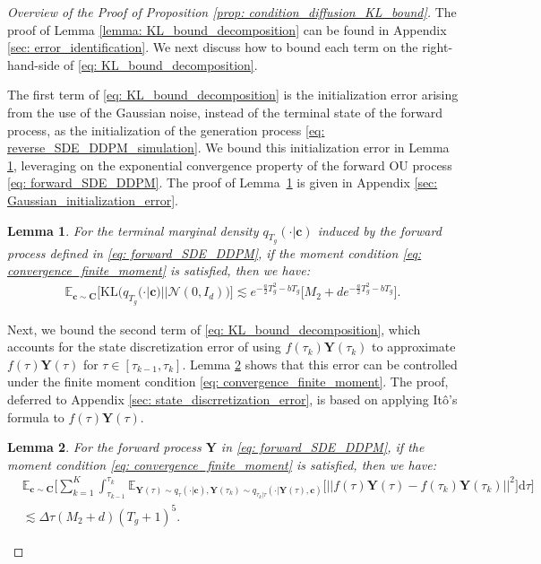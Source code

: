 \documentclass[11pt]{article}
\newtheorem{lemma}{Lemma}
\newcommand{\mE}{\mathbb{E}}
\newcommand{\bY}{\mathbf{Y}}
\newcommand{\bc}{\mathbf{c}}
\newcommand{\bC}{\mathbf{C}}
\newcommand{\KL}{\text{KL}}
\newcommand{\intd}{\mathrm{d}}
\begin{document}
\begin{proof}[Overview of the Proof of Proposition \ref{prop: condition_diffusion_KL_bound}]
The proof of Lemma \ref{lemma: KL_bound_decomposition} can be found in Appendix \ref{sec: error_identification}. We next discuss how to bound each term on the right-hand-side of \eqref{eq: KL_bound_decomposition}.



The first term of \eqref{eq: KL_bound_decomposition} is the initialization error arising from the use of the Gaussian noise, instead of the terminal state of the forward process, as the initialization of the generation process \eqref{eq: reverse_SDE_DDPM_simulation}. We bound this initialization error in Lemma \ref{lemma: initial_dist_error_bound}, leveraging on the exponential convergence property of the forward OU process \eqref{eq: forward_SDE_DDPM}. The proof of Lemma~\ref{lemma: initial_dist_error_bound} is given in Appendix \ref{sec: Gaussian_initialization_error}.


\begin{lemma}\label{lemma: initial_dist_error_bound}
For the terminal marginal density $q_{T_g}(\cdot | \bc)$ induced by the forward process defined in \eqref{eq: forward_SDE_DDPM}, if the moment condition \eqref{eq: convergence_finite_moment} is satisfied, then we have:
    \begin{align*}
        \mE_{\bc\sim\bC}\bigg[\KL\big(q_{T_g}(\cdot | \bc) || \mathcal{N}(0, I_d)\big)\bigg]\lesssim e^{-\frac{a}{2}T_g^2 - bT_g}\big[M_2 + de^{-\frac{a}{2}T_g^2 - bT_g}\big].
    \end{align*}
\end{lemma}

Next, we bound the second term of \eqref{eq: KL_bound_decomposition}, which accounts for the state discretization error of using $f(\tau_k)\bY(\tau_k)$ to approximate $f(\tau)\bY(\tau)$ for $\tau\in[\tau_{k - 1}, \tau_k]$. Lemma \ref{lemma: state_discrete_error_bound} shows that this error can be controlled under the finite moment condition \eqref{eq: convergence_finite_moment}. The proof, deferred to Appendix \ref{sec: state_discrretization_error}, is based on applying It\^{o}'s formula to $f(\tau)\bY(\tau)$.



\begin{lemma}\label{lemma: state_discrete_error_bound}
    For the forward process $\bY$ in \eqref{eq: forward_SDE_DDPM}, if the moment condition \eqref{eq: convergence_finite_moment} is satisfied, then we have:
    \begin{align*}
    &\mE_{\bc\sim\bC}\bigg[\sum_{k=1}^{K} \int_{\tau_{k -1}}^{\tau_k}\mE_{\bY(\tau)\sim q_\tau(\cdot | \bc), \bY(\tau_k)\sim q_{\tau_k | \tau}(\cdot | \bY(\tau), \bc)}\big[||f(\tau)\bY(\tau) - f(\tau_k)\bY(\tau_k)||^2\big]\intd\tau\bigg] \\
    &\lesssim \Delta\tau(M_2 + d)(T_g + 1)^5.
\end{align*}
\end{lemma}



\end{proof}
\end{document}
